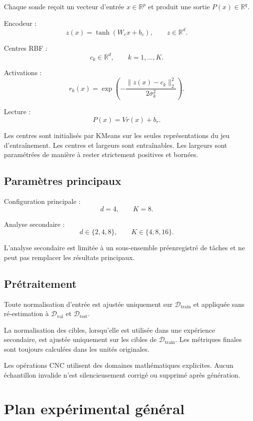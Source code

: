 \documentclass[11pt,a4paper]{article}
\newcommand{\Train}{\mathcal{D}_{\mathrm{train}}}
\newcommand{\Valid}{\mathcal{D}_{\mathrm{val}}}
\newcommand{\Test}{\mathcal{D}_{\mathrm{test}}}
\begin{document}
Chaque sonde reçoit un vecteur d'entrée
$x\in\mathbb{R}^{p}$ et produit une sortie
$P(x)\in\mathbb{R}^{q}$.

Encodeur :
\[
z(x)=\tanh(W_e x+b_e), \qquad z\in\mathbb{R}^{d}.
\]

Centres RBF :
\[
c_k\in\mathbb{R}^{d},\qquad k=1,\ldots,K.
\]

Activations :
\[
r_k(x)=
\exp\left(
-\frac{\|z(x)-c_k\|_2^2}{2\sigma_k^2}
\right).
\]

Lecture :
\[
P(x)=V r(x)+b_r.
\]

Les centres sont initialisés par KMeans sur les seules représentations
du jeu d'entraînement. Les centres et largeurs sont entraînables.
Les largeurs sont paramétrées de manière à rester strictement positives
et bornées.

\subsection{Paramètres principaux}

Configuration principale :
\[
d=4,\qquad K=8.
\]

Analyse secondaire :
\[
d\in\{2,4,8\},\qquad K\in\{4,8,16\}.
\]

L'analyse secondaire est limitée à un sous-ensemble préenregistré de
tâches et ne peut pas remplacer les résultats principaux.

\subsection{Prétraitement}

Toute normalisation d'entrée est ajustée uniquement sur
$\Train$ et appliquée sans ré-estimation à $\Valid$ et $\Test$.

La normalisation des cibles, lorsqu'elle est utilisée dans une
expérience secondaire, est ajustée uniquement sur les cibles de
$\Train$. Les métriques finales sont toujours calculées dans les
unités originales.

Les opérations CNC utilisent des domaines mathématiques explicites.
Aucun échantillon invalide n'est silencieusement corrigé ou supprimé
après génération.

\section{Plan expérimental général}
\end{document}
